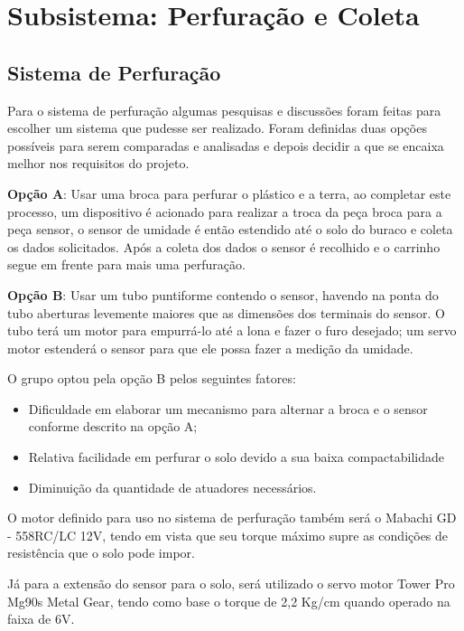 \section{Subsistema: Perfuração e Coleta}

  \subsection{Sistema de Perfuração}
  
  Para o sistema de perfuração algumas pesquisas e discussões foram feitas para escolher um sistema que pudesse ser realizado. Foram definidas duas opções possíveis para serem comparadas e analisadas e depois decidir a que se encaixa melhor nos requisitos do projeto.

  \textbf{Opção A}: Usar uma broca para perfurar o plástico e a terra, ao completar este
  processo, um dispositivo é acionado para realizar a troca da peça broca para
  a peça sensor, o sensor de umidade é então estendido até o solo do buraco e
  coleta os dados solicitados. Após a coleta dos dados o sensor é recolhido e o
  carrinho segue em frente para mais uma perfuração.

  \textbf{Opção B}: Usar um tubo puntiforme contendo o sensor, havendo na ponta do tubo
  aberturas levemente maiores que as dimensões dos terminais do sensor. O tubo
  terá um motor para empurrá-lo até a lona e fazer o furo desejado; um servo
  motor estenderá o sensor para que ele possa fazer a medição da umidade.

  O grupo optou pela opção B pelos seguintes fatores:

  \begin{itemize}
    \item Dificuldade em elaborar um mecanismo para alternar a broca e o sensor
    conforme descrito na opção A;
    \item Relativa facilidade em perfurar o solo devido a sua baixa compactabilidade
    \item Diminuição da quantidade de atuadores necessários.
  \end{itemize}

  O motor definido para uso no sistema de perfuração também será o
  Mabachi GD - 558RC/LC 12V, tendo em vista que seu torque máximo supre as
  condições de resistência que o solo pode impor.

  Já para a extensão do sensor para o solo, será utilizado o servo motor Tower
  Pro Mg90s Metal Gear, tendo como base o torque de 2,2 Kg/cm quando operado na faixa de 6V.

